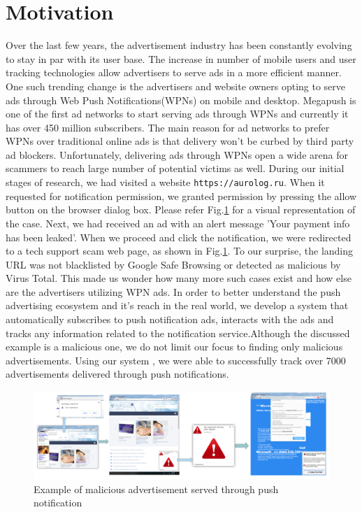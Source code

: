 \section{Motivation}
Over the last few years, the advertisement industry has been constantly evolving to stay in par with its user base. The increase in number of mobile users and user tracking technologies allow advertisers to serve ads in a more efficient manner. One such trending change is the advertisers and website owners opting to serve ads through Web Push Notifications(WPNs) on mobile and desktop. Megapush is one of the first ad networks to start serving ads through WPNs and currently it has over 450 million subscribers. The main reason for ad networks to prefer WPNs over traditional online ads is that delivery won't be curbed by third party ad blockers. Unfortunately, delivering ads through WPNs open a wide arena for scammers to reach large number of potential victims as well. During our initial stages of research, we had visited a website \texttt{https://aurolog.ru}. When it requested for notification permission, we granted permission by pressing the allow button on the browser dialog box. Please refer Fig.\ref{tech_scam} for a visual representation of the case. Next, we had received an ad with an alert message 'Your payment info has been leaked'. When we proceed and click the notification, we were redirected to a tech support scam web page, as shown in Fig.\ref{tech_scam}. To our surprise, the landing URL was not blacklisted by Google Safe Browsing or detected as malicious by Virus Total. This made us wonder how many more such cases exist and how else are the advertisers utilizing WPN ads. In order to better understand the push advertising ecosystem and it's reach in the real world, we develop a system  \sysname that automatically subscribes to push notification ads, interacts with the ads and tracks any information related to the notification service.Although the discussed example is a malicious one, we do not limit our focus to finding only malicious advertisements. Using our system \sysname, we were able to successfully track over 7000 advertisements delivered through push notifications. 

\begin{figure}[ht]
\begin{center}
\includegraphics[scale=0.07]{figs/tech_scam.pdf}
\caption{Example of malicious advertisement served through push notification}
\label{tech_scam}
\end{center}
\end{figure}

